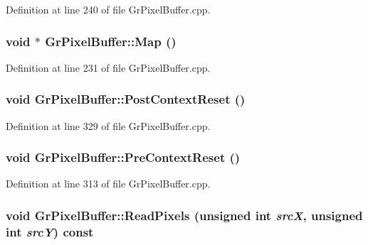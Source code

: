 \begin{CompactItemize}
Definition at line 240 of file GrPixelBuffer.cpp.\hypertarget{class_gr_pixel_buffer_9c3e8ac0a0ffb59a657d7abb458a2a89}{
\subsubsection[{Map}]{\setlength{\rightskip}{0pt plus 5cm}void $\ast$ GrPixelBuffer::Map ()}}
\label{class_gr_pixel_buffer_9c3e8ac0a0ffb59a657d7abb458a2a89}




Definition at line 231 of file GrPixelBuffer.cpp.\hypertarget{class_gr_pixel_buffer_7fb50727fb5183b68760aae61fb658cb}{
\subsubsection[{PostContextReset}]{\setlength{\rightskip}{0pt plus 5cm}void GrPixelBuffer::PostContextReset ()}}
\label{class_gr_pixel_buffer_7fb50727fb5183b68760aae61fb658cb}




Definition at line 329 of file GrPixelBuffer.cpp.\hypertarget{class_gr_pixel_buffer_13acc2beb0f889e2706416362937412b}{
\subsubsection[{PreContextReset}]{\setlength{\rightskip}{0pt plus 5cm}void GrPixelBuffer::PreContextReset ()}}
\label{class_gr_pixel_buffer_13acc2beb0f889e2706416362937412b}




Definition at line 313 of file GrPixelBuffer.cpp.\hypertarget{class_gr_pixel_buffer_a7010451d7c02dd31cf2ff13eaa4549e}{
\subsubsection[{ReadPixels}]{\setlength{\rightskip}{0pt plus 5cm}void GrPixelBuffer::ReadPixels (unsigned int {\em srcX}, \/  unsigned int {\em srcY}) const}}
\label{class_gr_pixel_buffer_a7010451d7c02dd31cf2ff13eaa4549e}





\end{CompactItemize}
